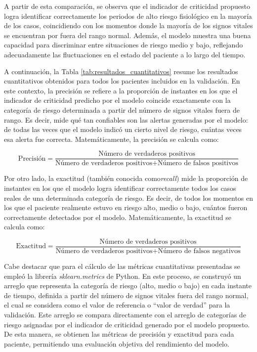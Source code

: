 A partir de esta comparación, se observa que el indicador de criticidad propuesto logra identificar correctamente los periodos de alto riesgo fisiológico en la mayoría de los casos, coincidiendo con los momentos donde la mayoría de los signos vitales se encuentran por fuera del rango normal. Además, el modelo muestra una buena capacidad para discriminar entre situaciones de riesgo medio y bajo, reflejando adecuadamente las fluctuaciones en el estado del paciente a lo largo del tiempo.

A continuación, la Tabla \ref{tab:resultados_cuantitativos} resume los resultados cuantitativos obtenidos para todos los pacientes incluidos en la validación. En este contexto, la precisión se refiere a la proporción de instantes en los que el indicador de criticidad predicho por el modelo coincide exactamente con la categoría de riesgo determinada a partir del número de signos vitales fuera de rango. Es decir, mide qué tan confiables son las alertas generadas por el modelo: de todas las veces que el modelo indicó un cierto nivel de riesgo, cuántas veces esa alerta fue correcta. Matemáticamente, la precisión se calcula como:

$$ \text{Precisión} = \frac{\text{Número de verdaderos positivos}}{\text{Número de verdaderos positivos} + \text{Número de falsos positivos}} $$

Por otro lado, la exactitud (también conocida como\textit{recall}) mide la proporción de instantes en los que el modelo logra identificar correctamente todos los casos reales de una determinada categoría de riesgo. Es decir, de todos los momentos en los que el paciente realmente estuvo en riesgo alto, medio o bajo, cuántos fueron correctamente detectados por el modelo. Matemáticamente, la exactitud se calcula como:

$$ \text{Exactitud} = \frac{\text{Número de verdaderos positivos}}{\text{Número de verdaderos positivos} + \text{Número de falsos negativos}} $$

Cabe destacar que para el cálculo de las métricas cuantitativas presentadas se empleó la librería \textit{sklearn.metrics} de Python. En este proceso, se construyó un arreglo que representa la categoría de riesgo (alto, medio o bajo) en cada instante de tiempo, definida a partir del número de signos vitales fuera del rango normal, el cual se considera como el valor de referencia o ``valor de verdad'' para la validación. Este arreglo se compara directamente con el arreglo de categorías de riesgo asignadas por el indicador de criticidad generado por el modelo propuesto. De esta manera, se obtienen las métricas de precisión y exactitud para cada paciente, permitiendo una evaluación objetiva del rendimiento del modelo.

